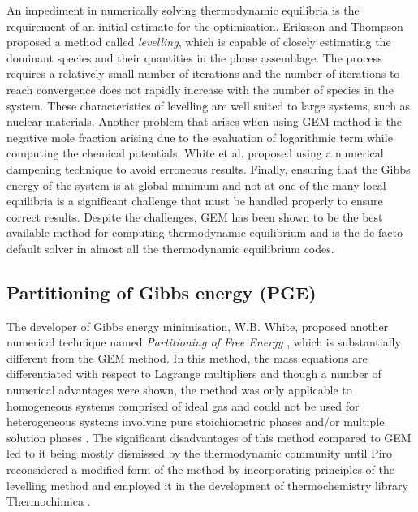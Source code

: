 	An impediment in numerically solving thermodynamic equilibria is the requirement of an initial estimate for the optimisation. Eriksson and Thompson \cite{Eriksson89} proposed a method called \emph{levelling}, which is capable of closely estimating the dominant species and their quantities in the phase assemblage. The process requires a relatively small number of iterations and the number of iterations to reach convergence does not rapidly increase with the number of species in the system. These characteristics of levelling are well suited to large systems, such as nuclear materials. Another problem that arises when using GEM method is the negative mole fraction arising due to the evaluation of logarithmic term while computing the chemical potentials. White et al. proposed using a numerical dampening technique to avoid erroneous results. Finally, ensuring that the Gibbs energy of the system is at global minimum and not at one of the many local equilibria is a significant challenge that must be handled properly to ensure correct results. Despite the challenges, GEM has been shown to be the best available method for computing thermodynamic equilibrium and is the de-facto default solver in almost all the thermodynamic equilibrium codes.

	\subsection{Partitioning of Gibbs energy (PGE)}
	The developer of Gibbs energy minimisation, W.B. White, proposed another numerical technique named \emph{Partitioning of Free Energy}  \cite{White67}, which is substantially different from the GEM method. In this method, the mass equations are differentiated with respect to Lagrange multipliers and though a number of numerical advantages were shown, the method was only applicable to homogeneous systems comprised of ideal gas and could not be used for heterogeneous systems involving pure stoichiometric phases and/or multiple solution phases \cite{White67,vanZeggeren11}. The significant disadvantages of this method compared to GEM led to it being mostly dismissed by the thermodynamic community until Piro \cite{Piro11b} reconsidered a modified form of the method by incorporating principles of the levelling method and employed it in the development of thermochemistry library {Thermochimica} \cite{Piro13}.

